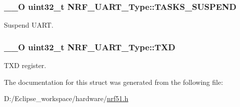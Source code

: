 \subsubsection[{T\+A\+S\+K\+S\+\_\+\+S\+U\+S\+P\+E\+N\+D}]{\setlength{\rightskip}{0pt plus 5cm}\+\_\+\+\_\+\+O uint32\+\_\+t N\+R\+F\+\_\+\+U\+A\+R\+T\+\_\+\+Type\+::\+T\+A\+S\+K\+S\+\_\+\+S\+U\+S\+P\+E\+N\+D}\label{struct_n_r_f___u_a_r_t___type_ae16d0ad0df5041d1c350cde23abdd44c}
Suspend U\+A\+R\+T. \hypertarget{struct_n_r_f___u_a_r_t___type_a08b4d917f98a24a8907abdca02c8418a}{}
\subsubsection[{T\+X\+D}]{\setlength{\rightskip}{0pt plus 5cm}\+\_\+\+\_\+\+O uint32\+\_\+t N\+R\+F\+\_\+\+U\+A\+R\+T\+\_\+\+Type\+::\+T\+X\+D}\label{struct_n_r_f___u_a_r_t___type_a08b4d917f98a24a8907abdca02c8418a}
T\+X\+D register. 

The documentation for this struct was generated from the following file\+:\begin{DoxyCompactItemize}
\item 
D\+:/\+Eclipse\+\_\+workspace/hardware/\hyperlink{nrf51_8h}{nrf51.\+h}\end{DoxyCompactItemize}
